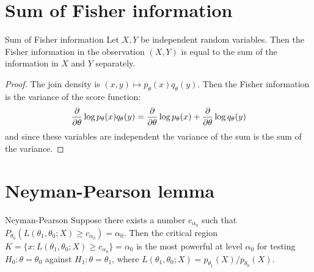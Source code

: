 \documentclass[12pt]{extarticle}
\begin{document}
\section{Sum of Fisher information}

\begin{lemma}{Sum of Fisher information}{}
	Let $X, Y$ be independent random variables.
	Then the Fisher information in the observation $(X, Y)$ is equal to the sum
	of the information in $X$ and $Y$ separately.
\end{lemma}

\begin{proof}
	The join density is $(x, y) \mapsto p_\theta(x) q_\theta(y)$.
	Then the Fisher information is the variance of the score function:
	\begin{equation}
		\pdv{\theta} \log p_\theta(x) q_\theta(y) = \pdv{\theta} \log p_\theta(x) + \pdv{\theta} \log q_\theta(y)
	\end{equation}
	and since these variables are independent the variance of the sum is the sum of the variance.
\end{proof}

\section{Neyman-Pearson lemma}

\begin{theorem}{Neyman-Pearson}{}
	Suppose there exists a number $c_{\alpha_0}$ such that
	$P_{\theta_0}(L(\theta_1, \theta_0; X) \geq c_{\alpha_0}) = \alpha_0$.
	Then the critical region
	$K = \{ x: L(\theta_1, \theta_0; X) \geq c_{\alpha_0} \} = \alpha_0$
	is the most powerful at level $\alpha_0$
	for testing $H_0: \theta = \theta_0$ against $H_1: \theta = \theta_1$,
	where $L(\theta_1, \theta_0; X) = p_{\theta_1}(X) / p_{\theta_0}(X)$.
\end{theorem}
\end{document}
